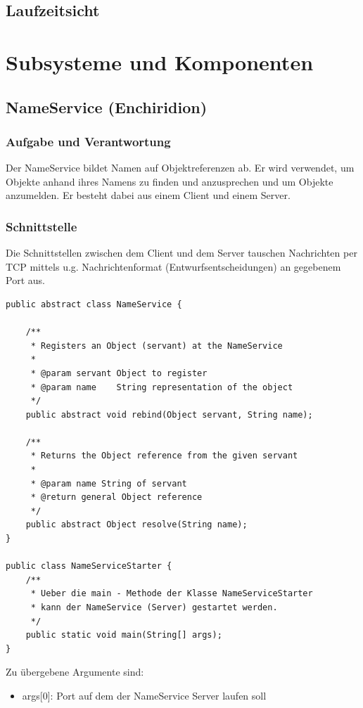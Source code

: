 \documentclass{article}
\begin{document}
\subsection{Laufzeitsicht}

\newpage

\section{Subsysteme und Komponenten}

\subsection{NameService (Enchiridion)}
\subsubsection{Aufgabe und Verantwortung}
Der NameService bildet Namen auf Objektreferenzen ab. Er wird verwendet, um Objekte anhand
ihres Namens zu finden und anzusprechen und um Objekte anzumelden. Er besteht dabei aus einem Client und einem Server.

\subsubsection{Schnittstelle}
Die Schnittstellen zwischen dem Client und dem Server tauschen Nachrichten per TCP mittels
u.g. Nachrichtenformat (Entwurfsentscheidungen) an gegebenem Port aus.
\begin{lstlisting}
public abstract class NameService {

    /**
     * Registers an Object (servant) at the NameService
     *
     * @param servant Object to register
     * @param name    String representation of the object
     */
    public abstract void rebind(Object servant, String name);

    /**
     * Returns the Object reference from the given servant
     *
     * @param name String of servant
     * @return general Object reference
     */
    public abstract Object resolve(String name);
}

public class NameServiceStarter {
    /**
     * Ueber die main - Methode der Klasse NameServiceStarter
     * kann der NameService (Server) gestartet werden.
     */
    public static void main(String[] args);
}
\end{lstlisting}
Zu übergebene Argumente sind:
\begin{itemize}
	\item args[0]: Port auf dem der NameService Server laufen soll
\end{itemize}
\end{document}

